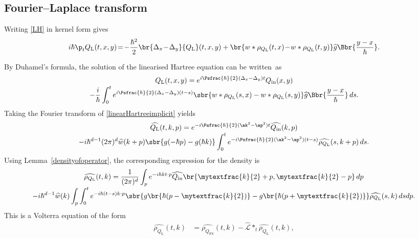 \subsection{Fourier--Laplace transform}
Writing \eqref{LH} in kernel form gives
\[
i\hbar\p_t{Q_{\mathrm{L}}}(t,x,y)\!=\!-{\frac{\hbar^2}{2}}\br{\Delta_x\!-\!\Delta_y}{Q_{\mathrm{L}}}(t,x,y)\\
+\br{w*\rho_{Q_{\mathrm{L}}}(t,x)\!-\!w*\rho_{Q_{\mathrm{L}}}(t,y)}\widehat g\Bbr{\frac{y-x}{\hbar}}.
\]

\pagebreak[2]
By Duhamel's formula, the solution of the linearised Hartree equation can be written~as\vspace*{-3pt}
\begin{multline}\label{linearHartreeimplicit}
{Q_{\mathrm{L}}}(t,x,y)=e^{i{\Psfrac{\hbar}{2}} (\Delta_x-\Delta_y)t}Q_{\mathrm{in}}(x,y)\\[-3pt]
-\frac{i}{\hbar}\int_0^te^{i{\Psfrac{\hbar}{2}}(\Delta_x-\Delta_y)(t-s)}\sbr{w*\rho_{Q_{\mathrm{L}}}(s,x)-w*\rho_{Q_{\mathrm{L}}}(s,y)}\widehat g\Bbr{\frac{y-x}{\hbar}}\,ds.
\end{multline}
Taking the Fourier transform of \eqref{linearHartreeimplicit} yields\vspace*{-3pt}
\begin{multline}\label{Fouriertransform}
\widehat {Q_{\mathrm{L}}}(t,k,p)=e^{-i{\Psfrac{\hbar}{2}}(\ak^2-\ap^2)t}\widehat{Q_{\mathrm{in}}}(k,p)\\[-3pt]
-i\hbar^{d-1}(2\pi)^d\widehat w(k+p)\sbr{g(-\hbar p)-g(\hbar k)}\int_0^te^{-i{\Psfrac{\hbar}{2}}(\ak^2-\ap^2)(t-s)}\widehat{\rho_{Q_{\mathrm{L}}}}(s,k+p)\,ds.
\end{multline}
Using Lemma~\ref{densityofoperator}, the corresponding expression for the density is\vspace*{-3pt}
\begin{multline*}
\widehat{\rho_{Q_{\mathrm{L}}}}(t,k)=\frac{1}{(2\pi)^d}\int_p e^{-i\hbar kt\cdot p}\widehat{Q_{\mathrm{in}}}\br{\mytextfrac{k}{2}+p,\mytextfrac{k}{2}-p}\,dp\\[-3pt]
-i\hbar^{d-1}\widehat w(k)\int_p\int_0^t e^{-i\hbar (t-s)k\cdot p}\sbr{g\br{\hbar (p-\mytextfrac{k}{2})}-g\br{\hbar (p+\mytextfrac{k}{2})}}\widehat{\rho_{Q_{\mathrm{L}}}}(s,k)\,dsdp.
\end{multline*}
This is a Volterra equation of the form\vspace*{-3pt}
\begin{align}\label{linearHartreeFourierimplicit}
\widehat{\rho_{Q_{\mathrm{L}}}}(t,k)&=\widehat{\rho_{{Q_{\mathrm{FS}}}}}(t,k)-\widehat {\mathscr L}*_{t}\widehat{\rho_{Q_{\mathrm{L}}}}(t,k),
\end{align}

